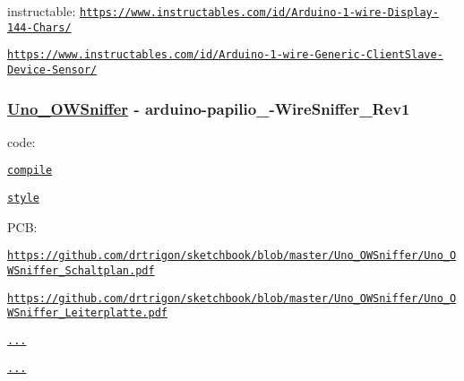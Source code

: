 instructable\-: \href{https://www.instructables.com/id/Arduino-1-wire-Display-144-Chars/}{\tt https\-://www.\-instructables.\-com/id/\-Arduino-\/1-\/wire-\/\-Display-\/144-\/\-Chars/}
\begin{DoxyItemize}
\item \href{https://www.instructables.com/id/Arduino-1-wire-Generic-ClientSlave-Device-Sensor/}{\tt https\-://www.\-instructables.\-com/id/\-Arduino-\/1-\/wire-\/\-Generic-\/\-Client\-Slave-\/\-Device-\/\-Sensor/}
\end{DoxyItemize}

\subsubsection*{\hyperlink{namespaceUno__OWSniffer}{Uno\-\_\-\-O\-W\-Sniffer} -\/ arduino-\/papilio\-\_-\/\-Wire\-Sniffer\-\_\-\-Rev1}

code\-:
\begin{DoxyItemize}
\item \href{https://github.com/drtrigon/sketchbook/blob/result/docu/Uno_OWSniffer/Uno_OWSniffer.py.compile}{\tt compile}
\item \href{https://github.com/drtrigon/sketchbook/blob/result/docu/Uno_OWSniffer/Uno_OWSniffer.py.style}{\tt style}
\end{DoxyItemize}

P\-C\-B\-:
\begin{DoxyItemize}
\item \href{https://github.com/drtrigon/sketchbook/blob/master/Uno_OWSniffer/Uno_OWSniffer_Schaltplan.pdf}{\tt https\-://github.\-com/drtrigon/sketchbook/blob/master/\-Uno\-\_\-\-O\-W\-Sniffer/\-Uno\-\_\-\-O\-W\-Sniffer\-\_\-\-Schaltplan.\-pdf}
\item \href{https://github.com/drtrigon/sketchbook/blob/master/Uno_OWSniffer/Uno_OWSniffer_Leiterplatte.pdf}{\tt https\-://github.\-com/drtrigon/sketchbook/blob/master/\-Uno\-\_\-\-O\-W\-Sniffer/\-Uno\-\_\-\-O\-W\-Sniffer\-\_\-\-Leiterplatte.\-pdf}
\end{DoxyItemize}

 \href{https://github.com/drtrigon/sketchbook/blob/master/Uno_OWSniffer/Uno_OWSniffer_Steckplatine.png}{\tt ...}

 \href{https://github.com/drtrigon/eagle/blob/result/pcb/projects/arduino-papilio_1-WireSniffer_Rev1/1-Wire_Sniffer_REV1_sch.png}{\tt ...}

